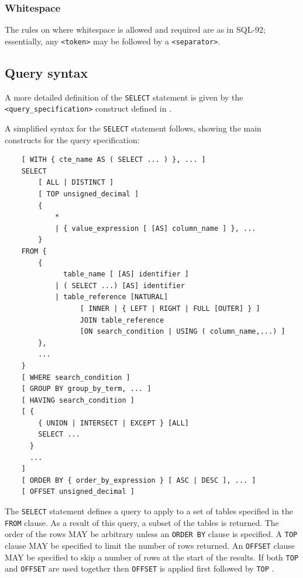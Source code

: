 \documentclass[11pt,a4paper]{ivoa}
\begin{document}
\subsubsection{Whitespace}
\label{sec:whitespace}

The rules on where whitespace is allowed and required are as in SQL-92;
essentially, any \verb:<token>: may be followed by a \verb:<separator>:.

\clearpage %
\subsection{Query syntax}
\label{sec:syntax}

A more detailed definition of the \verb:SELECT: statement is given by the \verb:<query_specification>:
construct defined in .

A simplified syntax for the \verb:SELECT: statement follows, showing the main constructs for
the query specification:

\begin{verbatim}
    [ WITH { cte_name AS ( SELECT ... ) }, ... ]
    SELECT
        [ ALL | DISTINCT ]
        [ TOP unsigned_decimal ]
        {
            *
            | { value_expression [ [AS] column_name ] }, ...
        }
    FROM {
        {
              table_name [ [AS] identifier ]
            | ( SELECT ...) [AS] identifier
            | table_reference [NATURAL]
                  [ INNER | { LEFT | RIGHT | FULL [OUTER] } ]
                  JOIN table_reference
                  [ON search_condition | USING ( column_name,...) ]
        },
        ...
    }
    [ WHERE search_condition ]
    [ GROUP BY group_by_term, ... ]
    [ HAVING search_condition ]
    [ {
        { UNION | INTERSECT | EXCEPT } [ALL]
        SELECT ...
      }
      ...
    ]
    [ ORDER BY { order_by_expression } [ ASC | DESC ], ... ]
    [ OFFSET unsigned_decimal ]
\end{verbatim}

The \verb:SELECT: statement defines a query to apply to a set of tables specified
in the \verb:FROM: clause. As a result of this query, a subset of the tables
is returned.
The order of the rows MAY be arbitrary unless an \verb:ORDER BY: clause is specified.
A \verb:TOP: clause MAY be specified to limit the number of rows returned. 
An \verb:OFFSET: clause MAY be specified to skip a number of rows at the start
of the results.
If both \verb:TOP: and \verb:OFFSET: are used together then \verb:OFFSET: is applied
first followed by \verb:TOP: . 
\end{document}
